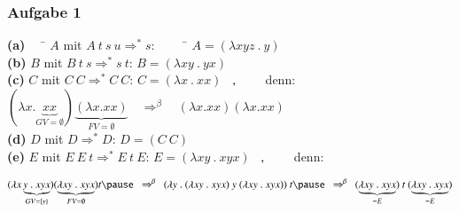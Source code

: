 \documentclass[aspectratio=1610,onlymath, ngerman]{beamer}
\renewcommand{\emph}[1]{\textbf{#1}}
\begin{document}
	\begin{frame} \frametitle{Aufgabe 1}
	\small
		\begin{tabbing}
		\emph{(a)} $\quad$ \= $A$ mit $A \ t \ s \ u \Rightarrow^\ast s$:
		\pause $\qquad$ \= $A = (\lambda xyz \ . \ y)$ \\[6pt]
		\pause
		\emph{(b)} \> $B$ mit $B \ t \ s \Rightarrow^\ast s \ t$: 
		\pause \> $B = (\lambda xy \ . \ yx)$ \\[6pt]
		\pause
		\emph{(c)} \> $C$ mit $C \ C \Rightarrow^\ast C \ C$: 
		\pause \> $C =( \lambda x \ . \ xx)$ 
		\pause $\enskip , \qquad$ denn: 
		$(\lambda x . \underbrace{xx}_{GV=\emptyset}) \underbrace{(\lambda x.xx)}_{FV = \emptyset} \quad \Rightarrow^{\beta} \quad (\lambda x . xx) (\lambda x.xx)$ \\[6pt]
		\pause
		\emph{(d)} \> $D$ mit $D \Rightarrow^\ast D$: 
		\pause \> $D = (C \ C)$ \\[6pt]
		\pause	
		\emph{(e)} \> $E$ mit $E \ E \ t \Rightarrow^\ast E \ t \ E$: 
		\pause \> $E = (\lambda xy \ . \ xyx)$ \pause $\enskip , \qquad$ denn:
		\end{tabbing}
		\begin{equation*}
			(\lambda x\underbrace{y \ . \ xyx}_{GV = \{y\}}) (\underbrace{\lambda xy \ . \ xyx}_{FV = \emptyset}) t 
			\pause \enskip \Rightarrow^{\beta} \enskip
			(\lambda y \ . \ (\lambda xy \ . \ xyx) \ y \ (\lambda xy \ . \ xyx)) \ t 
			\pause \enskip \Rightarrow^{\beta} \enskip 
			(\underbrace{\lambda xy \ . \ xyx}_{ = E}) \ t \ (\underbrace{\lambda xy \ . \ xyx}_{=E})
		\end{equation*}
	\end{frame}
\end{document}
